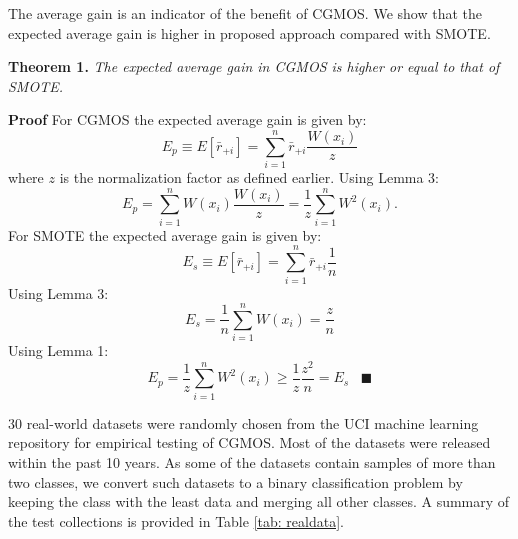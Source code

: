 \documentclass{iitthesis}
\begin{document}
The average gain is an indicator of the benefit of CGMOS. We show that the expected average gain is higher in proposed approach compared with SMOTE.

\noindent \textbf{Theorem 1.} \textit{The expected average gain in CGMOS is higher or equal to that of SMOTE.}


\noindent\textbf{Proof} For CGMOS the expected average gain is given by:
\begin{equation}
E_p\equiv E[\bar{r}_{+i}] = \sum_{i=1}^n \bar{r}_{+i} \frac{W(x_i)}{z}
\end{equation}
where $z$ is the normalization factor as defined earlier. 
Using Lemma 3:
\begin{equation}
E_p=\sum_{i=1}^n W(x_i)\frac{W(x_i)}{z}=\frac{1}{z}\sum_{i=1}^n W^2(x_i).
\end{equation}
\newline
\noindent For SMOTE the expected average gain is given by:
\begin{equation}
E_s\equiv E[\bar{r}_{+i}] = \sum_{i=1}^n \bar{r}_{+i} \frac{1}{n}
\end{equation}
Using Lemma 3:
\begin{equation}
E_s = \frac{1}{n}\sum_{i=1}^n W(x_i) =\frac{z}{n}
\end{equation}
Using Lemma 1:
\begin{equation}
E_p= \frac{1}{z}\sum_{i=1}^n W^2(x_i)\geq \frac{1}{z}\frac{z^2}{n}= E_s \;\;\;\blacksquare
\end{equation}


 30 real-world datasets were randomly chosen from the UCI machine learning repository \cite{Lichman:2013} for empirical testing of CGMOS. Most of the datasets were released within the past 10 years. As some of the datasets contain samples of more than two classes, we convert such datasets to a binary classification problem by keeping the class with the least data and merging all other classes. A summary of the test collections is provided in Table \ref{tab: realdata}.
\end{document}
